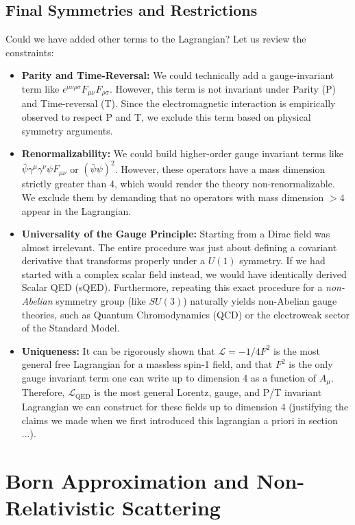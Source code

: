 \subsection{Final Symmetries and Restrictions}
Could we have added other terms to the Lagrangian? Let us review the constraints:
\begin{itemize}
    \item \textbf{Parity and Time-Reversal:} We could technically add a gauge-invariant term like $\epsilon^{\mu\nu\rho\sigma}F_{\mu\nu}F_{\rho\sigma}$. However, this term is not invariant under Parity (P) and Time-reversal (T). Since the electromagnetic interaction is empirically observed to respect P and T, we exclude this term based on physical symmetry arguments.
    \item \textbf{Renormalizability:} We could build higher-order gauge invariant terms like $\bar{\psi}\gamma^\mu\gamma^\nu\psi F_{\mu\nu}$ or $(\bar{\psi}\psi)^2$. However, these operators have a mass dimension strictly greater than 4, which would render the theory non-renormalizable. We exclude them by demanding that no operators with mass dimension $>4$ appear in the Lagrangian.
    \item \textbf{Universality of the Gauge Principle:} Starting from a Dirac field was almost irrelevant. The entire procedure was just about defining a covariant derivative that transforms properly under a $U(1)$ symmetry. If we had started with a complex scalar field instead, we would have identically derived Scalar QED (sQED). Furthermore, repeating this exact procedure for a \textit{non-Abelian} symmetry group (like $SU(3)$) naturally yields non-Abelian gauge theories, such as Quantum Chromodynamics (QCD) or the electroweak sector of the Standard Model.
    \item \textbf{Uniqueness:} It can be rigorously shown that $\mathcal{L} = -1/4 F^2$ is the most general free Lagrangian for a massless spin-1 field, and that $F^2$ is the only gauge invariant term one can write up to dimension 4 as a function of $A_\mu$. Therefore, $\mathcal{L}_{\text{QED}}$ is the most general Lorentz, gauge, and P/T invariant Lagrangian we can construct for these fields up to dimension 4 (justifying the claims we made when we first introduced this lagrangian a priori in section ...).
\end{itemize}

\section{Born Approximation and Non-Relativistic Scattering} 

